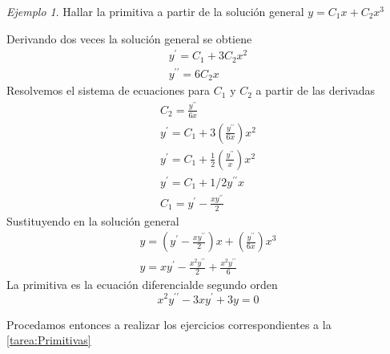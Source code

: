 \documentclass[12pt]{article} %
\theoremstyle{remark} %
\newcounter{ejercicio}[tarea]
\newtheorem{ejemplo}{Ejemplo}[section]
\newcommand{\ed}{ecuación diferencial}
\begin{document}
\begin{ejemplo}
  Hallar la primitiva a partir de la solución general $y = C_1x + C_2x^3$

  Derivando dos veces la solución general se obtiene
  \begin{gather*}
    y^{\prime} = C_1 + 3C_2x^2\\
    y^{\prime \prime} = 6C_2x
  \end{gather*}
  Resolvemos el sistema de ecuaciones para $C_1$ y $C_2$ a partir de las derivadas
  \begin{gather*}
    C_2 = \frac{y^{\prime \prime}}{6x}\\
    y^{\prime} = C_1 + 3 \left( \frac{y^{\prime \prime}}{6x} \right) x^2\\
    y^{\prime} = C_1 + \frac{1}{2} \left( \frac{y^{\prime \prime}}{x} \right) x^2\\
    y^{\prime} = C_1 + 1/2 y^{\prime \prime} x\\
    C_1 = y^{\prime} - \frac{x y^{\prime \prime}}{2}
  \end{gather*}
  Sustituyendo en la solución general
  \begin{gather*}
    y = \left( y^{\prime} - \frac{x y^{\prime \prime}}{2} \right) x + \left( \frac{y^{\prime \prime}}{6x} \right) x^3\\
    y = xy^{\prime} - \frac{x^2y^{\prime \prime}}{2} + \frac{x^2y^{\prime \prime}}{6}
  \end{gather*}
  La primitiva es la \ed de segundo orden \[ x^2y^{\prime \prime} - 3xy^{\prime} + 3y = 0 \]
\end{ejemplo}
Procedamos entonces a realizar los ejercicios correspondientes a la \cref{tarea:Primitivas}
\end{document}
